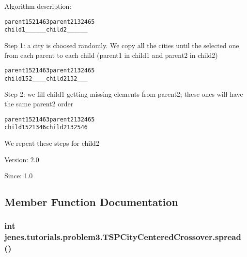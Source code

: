 Algorithm description: \small\begin{alltt}
      parent1  5 2 1 4 6 3     parent2   1 3 2 4 6 5
      child1   \_ \_ \_ \_ \_ \_     child2    \_ \_ \_ \_ \_ \_
\end{alltt}
\normalsize 
 Step 1: a city is choosed randomly. We copy all the cities until the selected one from each parent to each child (parent1 in child1 and parent2 in child2) \small\begin{alltt}
      parent1  5 2 1 4 6 3     parent2   1 3 2 4 6 5
      child1   5 2 \_ \_ \_ \_     child2    1 3 2 \_ \_ \_
 \end{alltt}
\normalsize 
 Step 2: we fill child1 getting missing elements from parent2; these ones will have the same parent2 order \small\begin{alltt}
      parent1  5 2 1 4 6 3     parent2  1 3 2 4 6 5
      child1   5 2 1 3 4 6     child2   1 3 2 5 4 6
\end{alltt}
\normalsize 


We repeat these steps for child2

\begin{Desc}
\item[Version:]2.0 \end{Desc}
\begin{Desc}
\item[Since:]1.0 \end{Desc}


\subsection{Member Function Documentation}
\hypertarget{classjenes_1_1tutorials_1_1problem3_1_1_t_s_p_city_centered_crossover_3a5e0f99396f1fb6dc89981969d58c13}{
\subsubsection[spread]{\setlength{\rightskip}{0pt plus 5cm}int jenes.tutorials.problem3.TSPCityCenteredCrossover.spread ()}}
\label{classjenes_1_1tutorials_1_1problem3_1_1_t_s_p_city_centered_crossover_3a5e0f99396f1fb6dc89981969d58c13}



